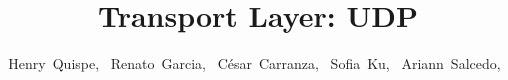 \documentclass[journal]{IEEEtran}
\begin{document}
%
\title{Transport Layer: UDP}
%
%
%

\author{Henry~Quispe,~
  Renato~Garcia,~
  César~Carranza,~
  Sofia~Ku,~
  Ariann~Salcedo,~%
}

% 
%
\end{document}
